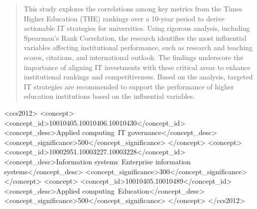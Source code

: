 \documentclass[sigconf]{acmart}
\begin{document}
\begin{abstract}
	This study explores the correlations among key metrics from the Times Higher Education (THE) rankings over a 10-year period to derive actionable IT strategies for universities. Using rigorous analysis, including Spearman's Rank Correlation, the research identifies the most influential variables affecting institutional performance, such as research and teaching scores, citations, and international outlook. The findings underscore the importance of aligning IT investments with these critical areas to enhance institutional rankings and competitiveness. Based on the analysis, targeted IT strategies are recommended to support the performance of higher education institutions based on the influential variables.
\end{abstract}

\begin{CCSXML}
	<ccs2012>
	<concept>
	<concept_id>10010405.10010406.10010430</concept_id>
	<concept_desc>Applied computing~IT governance</concept_desc>
	<concept_significance>500</concept_significance>
	</concept>
	<concept>
	<concept_id>10002951.10003227.10003228</concept_id>
	<concept_desc>Information systems~Enterprise information systems</concept_desc>
	<concept_significance>300</concept_significance>
	</concept>
	<concept>
	<concept_id>10010405.10010489</concept_id>
	<concept_desc>Applied computing~Education</concept_desc>
	<concept_significance>500</concept_significance>
	</concept>
	</ccs2012>
\end{CCSXML}


\end{document}
